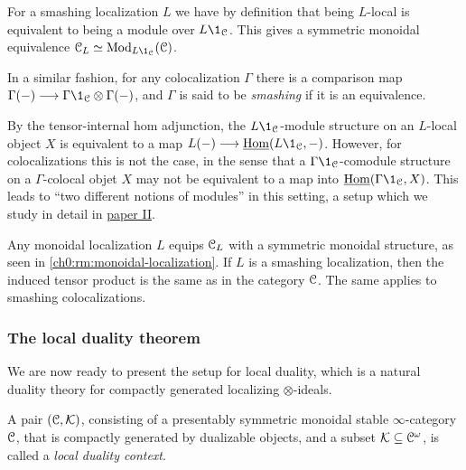 \begin{remark}
    \label{ch0:rm:smashing-then-modules-over-unit}
    For a smashing localization $L$ we have by definition that being $L$-local is equivalent to being a module over $L\1_\C$. This gives a symmetric monoidal equivalence $\C_L \simeq \Mod_{L\1_\C}(\C)$. 
\end{remark}

\begin{definition}
    \label{ch0:rm:smashing-colocalization}
    In a similar fashion, for any colocalization $\Gamma$ there is a comparison map $\Gamma (-)\to \Gamma \1_\C \otimes \Gamma(-)$, and $\Gamma$ is said to be \emph{smashing} if it is an equivalence. 
\end{definition}

\begin{remark}
    \label{ch0:rm:L1-module-adjoint-map}
    By the tensor-internal hom adjunction, the $L\1_\C$-module structure on an $L$-local object $X$ is equivalent to a map $L(-)\to \iHom(L\1_\C,-)$. However, for colocalizations this is not the case, in the sense that a $\Gamma\1_\C$-comodule structure on a $\Gamma$-colocal objet $X$ may not be equivalent to a map into $\iHom(\Gamma \1_\C, X)$. This leads to ``two different notions of modules'' in this setting, a setup which we study in detail in \hyperref[ch2]{paper II}.
\end{remark}

\begin{remark}
    Any monoidal localization $L$ equips $\EuScript{C}_L$ with a symmetric monoidal structure, as seen in \cref{ch0:rm:monoidal-localization}. If $L$ is a smashing localization, then the induced tensor product is the same as in the category $\EuScript{C}$. The same applies to smashing colocalizations. 
\end{remark}





\subsubsection{The local duality theorem}

We are now ready to present the setup for local duality, which is a natural duality theory for compactly generated localizing $\otimes$-ideals. 

\begin{definition}
    \label{ch0:def:local-duality-context}
    A pair $(\EuScript{C}, \mathcal{K})$, consisting of a presentably symmetric monoidal stable $\infty$-category $\EuScript{C}$, that is compactly generated by dualizable objects, and a subset $\mathcal{K}\subseteq \EuScript{C}^\omega$, is called a \emph{local duality context}.
\end{definition}

